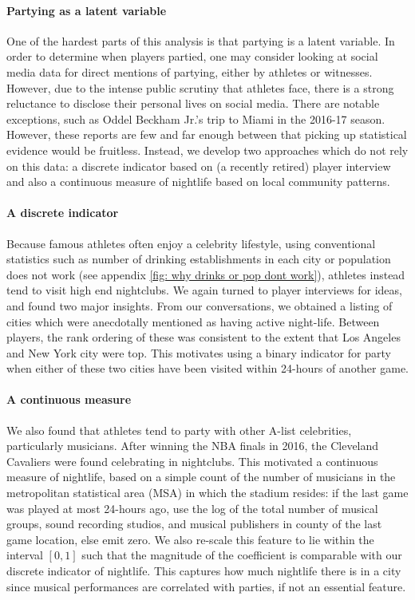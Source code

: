 \documentclass[letterpaper,12pt]{article}
\begin{document}
\paragraph{Partying as a latent variable}
One of the hardest parts of this analysis is that partying is a latent variable.
In order to determine when players partied, one may consider looking at social media data for direct mentions of partying, either by athletes or witnesses. However, due to the intense public scrutiny that athletes face, there is a strong reluctance to disclose their personal lives on social media. There are notable exceptions, such
as Oddel Beckham Jr.'s trip to Miami in the 2016-17 season.\citep{bieler, bleler}
However, these reports are few and far enough between that picking up statistical evidence would be fruitless.
Instead, we develop two approaches which do not rely on this data: a discrete indicator 
based on (a recently retired) player interview and also a continuous measure of nightlife based on local community patterns.

\paragraph{A discrete indicator}
Because famous athletes often enjoy a celebrity lifestyle, using conventional statistics
such as number of drinking establishments in each city or population does not work (see appendix \ref{fig: why drinks or pop dont work}), athletes instead
tend to visit high end nightclubs. We again turned to player interviews for ideas,
and found two major insights. From our conversations, 
we obtained a listing of cities which were anecdotally
mentioned as having active night-life. Between players, the rank ordering of these
was consistent to the extent that Los Angeles and New York city were top. 
This motivates using a binary indicator for party when either of these two cities have been visited within 24-hours of another game. 

\paragraph{A continuous measure}
We also found that athletes tend to party with other A-list celebrities,
particularly musicians.\citep{jbutlerdwade} After winning the NBA finals
in 2016, the Cleveland Cavaliers were found celebrating in nightclubs.\citep{xsclub} 
This motivated a continuous measure of nightlife, based on a simple count of the number of musicians in the metropolitan statistical area (MSA) 
in which the stadium resides: if the last game was played at most 24-hours ago, use the log of the total number
of musical groups, sound recording studios, and musical publishers in county of the 
last game location, else emit zero.  We also re-scale this feature to lie within the
interval $[0,1]$ such that the magnitude of the coefficient is comparable with our
discrete indicator of nightlife.
This captures how much nightlife there is in a city since musical performances are correlated
with parties, if not an essential feature.
\end{document}
